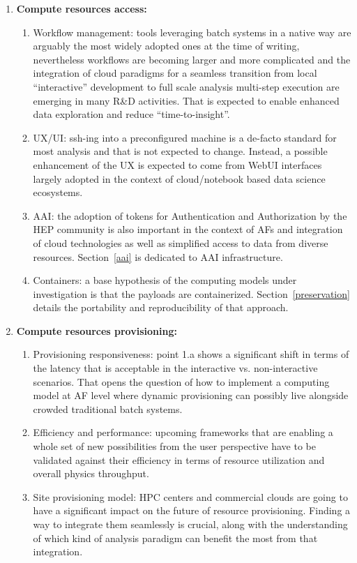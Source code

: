 \begin{enumerate}
    \item \textbf{Compute resources access:}
    \begin{enumerate}[label=(\alph*)]
        \item Workflow management: tools leveraging batch systems in a native way are arguably the most widely adopted ones at the time of writing, nevertheless workflows are becoming larger and more complicated and the integration of cloud paradigms for a seamless transition from local “interactive” development to full scale analysis multi-step execution are emerging in many R\&D activities. That is expected to enable enhanced data exploration and reduce “time-to-insight”.
        \item UX/UI: ssh-ing into a preconfigured machine is a de-facto standard for most analysis and that is not expected to change. Instead, a possible enhancement of the UX is expected to come from WebUI interfaces largely adopted in the context of cloud/notebook based data science ecosystems.
        \item 
        AAI: the adoption of tokens for Authentication and Authorization by the HEP community is also important in the context of AFs and integration of cloud technologies as well as simplified access to data from diverse resources. Section~\ref{aai} is dedicated to AAI infrastructure.
        \item Containers: a base hypothesis of the computing models under investigation is that the payloads are containerized. Section~\ref{preservation} details the portability and reproducibility of that approach.
    \end{enumerate}
    \item \textbf{Compute resources provisioning:}
    \begin{enumerate}[label=(\alph*)]
        \item Provisioning responsiveness: point 1.a shows a significant shift in terms of the latency that is acceptable in the interactive vs. non-interactive scenarios. That opens the question of how to implement a computing model at AF level where dynamic provisioning can possibly live alongside crowded traditional batch systems.
        \item Efficiency and performance: upcoming frameworks that are enabling a whole set of new possibilities from the user perspective have to be validated against their efficiency in terms of resource utilization and overall physics throughput. 
        \item Site provisioning model: HPC centers and commercial clouds are going to have a significant impact on the future of resource provisioning. Finding a way to integrate them seamlessly is crucial, along with the understanding of which kind of analysis paradigm can benefit the most from that integration. 

\end{enumerate}
\end{enumerate}
